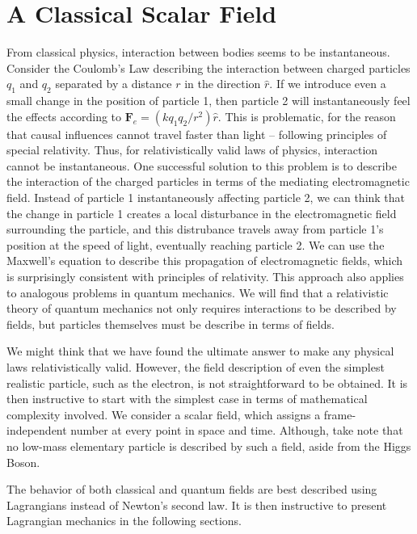 \chapter{A Classical Scalar Field}

From classical physics, interaction between bodies seems to be instantaneous. Consider the Coulomb's Law describing the interaction between charged particles $q_1$ and $q_2$ separated by a distance $r$ in the direction $\hat{r}$. If we introduce even a small change in the position of particle 1, then particle 2 will instantaneously feel the effects according to $\textbf{F}_e=(kq_1q_2/r^2)\hat{r}$. This is problematic, for the reason that causal influences cannot travel faster than light -- following principles of special relativity. Thus, for relativistically valid laws of physics, interaction cannot be instantaneous. One successful solution to this problem is to describe the interaction of the charged particles in terms of the mediating electromagnetic field. Instead of particle 1 instantaneously affecting particle 2, we can think that the change in particle 1 creates a local disturbance in the electromagnetic field surrounding the particle, and this distrubance travels away from particle 1's position at the speed of light, eventually reaching particle 2. We can use the Maxwell's equation to describe this propagation of electromagnetic fields, which is surprisingly consistent with principles of relativity. This approach also applies to analogous problems in quantum mechanics. We will find that a relativistic theory of quantum mechanics not only requires interactions to be described by fields, but particles themselves must be describe in terms of fields.

We might think that we have found the ultimate answer to make any physical laws relativistically valid. However, the field description of even the simplest realistic particle, such as the electron, is not straightforward to be obtained. It is then instructive to start with the simplest case in terms of mathematical complexity involved. We consider a scalar field, which assigns a frame-independent number at every point in space and time. Although, take note that no low-mass elementary particle is described by such a field, aside from the Higgs Boson.

The behavior of both classical and quantum fields are best described using Lagrangians instead of Newton's second law. It is then instructive to present Lagrangian mechanics in the following sections.

